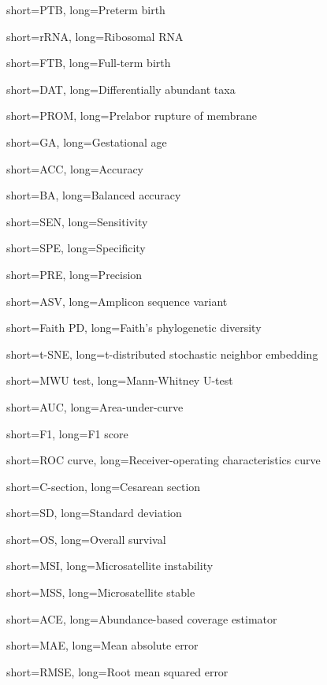 {
    short=PTB,
    long=Preterm birth
}

{
    short=rRNA,
    long=Ribosomal RNA
}

{
    short=FTB,
    long=Full-term birth
}

{
    short=DAT,
    long=Differentially abundant taxa
}

{
    short=PROM,
    long=Prelabor rupture of membrane
}

{
    short=GA,
    long=Gestational age
}

{
    short=ACC,
    long=Accuracy
}

{
    short=BA,
    long=Balanced accuracy
}

{
    short=SEN,
    long=Sensitivity
}

{
    short=SPE,
    long=Specificity
}

{
    short=PRE,
    long=Precision
}

{
    short=ASV,
    long=Amplicon sequence variant
}

{
    short=Faith PD,
    long=Faith's phylogenetic diversity
}

{
    short=t-SNE,
    long=t-distributed stochastic neighbor embedding
}

{
    short=MWU test,
    long=Mann-Whitney U-test
}

{
    short=AUC,
    long=Area-under-curve 
}

{
    short=F1,
    long=F1 score
}

{
    short=ROC curve,
    long=Receiver-operating characteristics curve
}

{
    short=C-section,
    long=Cesarean section
}

{
    short=SD,
    long=Standard deviation
}

{
    short=OS,
    long=Overall survival
}

{
    short=MSI,
    long=Microsatellite instability
}

{
    short=MSS,
    long=Microsatellite stable
}

{
    short=ACE,
    long=Abundance-based coverage estimator
}

{
    short=MAE,
    long=Mean absolute error
}

{
    short=RMSE,
    long=Root mean squared error
}
